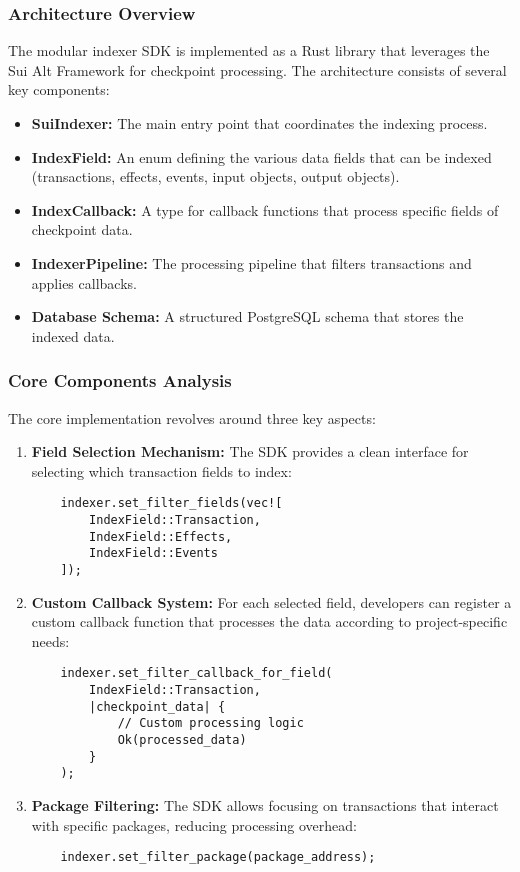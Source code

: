 \subsubsection{Architecture Overview}

The modular indexer SDK is implemented as a Rust library that leverages the Sui Alt Framework for checkpoint processing. The architecture consists of several key components:

\begin{itemize}
    \item \textbf{SuiIndexer:} The main entry point that coordinates the indexing process.
    \item \textbf{IndexField:} An enum defining the various data fields that can be indexed (transactions, effects, events, input objects, output objects).
    \item \textbf{IndexCallback:} A type for callback functions that process specific fields of checkpoint data.
    \item \textbf{IndexerPipeline:} The processing pipeline that filters transactions and applies callbacks.
    \item \textbf{Database Schema:} A structured PostgreSQL schema that stores the indexed data.
\end{itemize}

\subsubsection{Core Components Analysis}

The core implementation revolves around three key aspects:

\begin{enumerate}
    \item \textbf{Field Selection Mechanism:} The SDK provides a clean interface for selecting which transaction fields to index:

    \begin{verbatim}
    indexer.set_filter_fields(vec![
        IndexField::Transaction,
        IndexField::Effects,
        IndexField::Events
    ]);
    \end{verbatim}

    \item \textbf{Custom Callback System:} For each selected field, developers can register a custom callback function that processes the data according to project-specific needs:

    \begin{verbatim}
    indexer.set_filter_callback_for_field(
        IndexField::Transaction,
        |checkpoint_data| {
            // Custom processing logic
            Ok(processed_data)
        }
    );
    \end{verbatim}

    \item \textbf{Package Filtering:} The SDK allows focusing on transactions that interact with specific packages, reducing processing overhead:

    \begin{verbatim}
    indexer.set_filter_package(package_address);
    \end{verbatim}
\end{enumerate}

